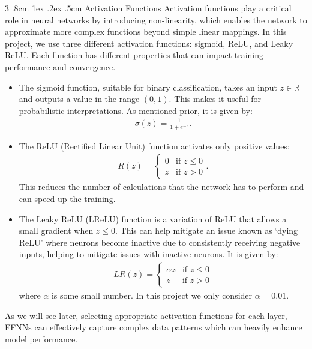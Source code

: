\documentclass[%
reprint,s
amsmath,amssymb,
aps,
]{revtex4-2}
\makeatletter
\renewcommand{\subsubsection}{%
	\@startsection
	{subsubsection}%
	{3}%
	{\z@}%
	{.8cm \@plus1ex \@minus .2ex}%
	{.5cm}%
	{\normalfont\small\centering}%
}
\makeatother
\begin{document}
\subsubsection{Activation Functions}
Activation functions play a critical role in neural networks by introducing non-linearity, which enables the network to approximate more complex functions beyond simple linear mappings. In this project, we use three different activation functions: sigmoid, ReLU, and Leaky ReLU. Each function has different properties that can impact training performance and convergence.
\begin{itemize}
	\item The sigmoid function, suitable for binary classification, takes an input $z\in\mathbb{R}$ and outputs a value in the range $(0,1)$. This makes it useful for probabilistic interpretations. As mentioned prior, it is given by:
	\begin{align} 
		\sigma(z)=\frac{1}{1+e^{-z}}.
	\end{align}
	\item The ReLU (Rectified Linear Unit) function activates only positive values: 
	\begin{align} 
		R(z)=
		\begin{cases}
			0 & \text{if }z\leq0\\z&\text{if }z>0
		\end{cases}.
	\end{align}
	This reduces the number of calculations that the network has to perform and can speed up the training.
	\item The Leaky ReLU (LReLU) function is a variation of ReLU that allows a small gradient when $z\leq0$. This can help mitigate an issue known as `dying ReLU' \cite{Lu_Lu_2020} where neurons become inactive due to consistently receiving negative inputs, helping to mitigate issues with inactive neurons. It is given by:
	\begin{align} 
		LR(z)=
		\begin{cases} 
			\alpha z&\text{if }z\leq0\\z&\text{if }z> 0 
		\end{cases} 
	\end{align}
	where $\alpha$ is some small number. In this project we only consider $\alpha=0.01$.
\end{itemize}
As we will see later, selecting appropriate activation functions for each layer, FFNNs can effectively capture complex data patterns which can heavily enhance model performance.
\end{document}
